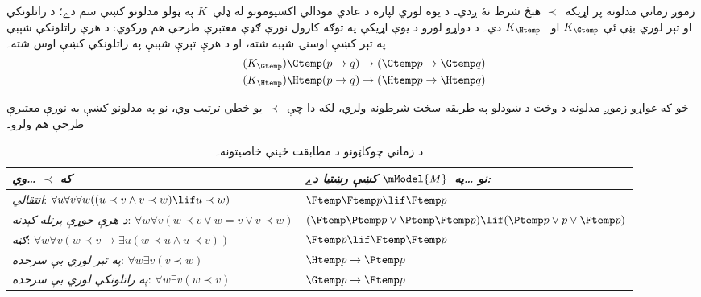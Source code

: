 \documentclass[../../../include/open-logic-section]{subfiles}
\begin{document}


زموږ زماني مدلونه پر اړيکه~$\prec$ هېڅ شرط نۀ ږدي۔ د يوه
لوري لپاره د عادي مودالي اکسيومونو له ډلې~$K$ په ټولو مدلونو
کښې سم دے؛ د راتلونکي او تېر لوري بڼې ئې $K_{\Gtemp}$ او
~$K_{\Htemp}$ دي۔ د دواړو لورو د يوې اړيکې په توګه کارول نورې
ګډې معتبرې طرحې هم ورکوي: د هرې راتلونکې شېبې په تېر کښې
اوسنۍ شېبه شته، او د هرې تېرې شېبې په راتلونکي کښې اوس شته۔
\begin{align*}
\tag{$K_{\Gtemp}$}  \Gtemp (p \to q) & \to (\Gtemp p \to \Gtemp q)\\
\tag{$K_{\Htemp}$}  \Htemp (p \to q) & \to (\Htemp p \to \Htemp q)
\end{align*}

خو که غواړو زموږ مدلونه د وخت د ښودلو په طريقه سخت شرطونه ولري،
لکه دا چې~$\prec$ يو خطي ترتيب وي، نو په مدلونو کښې به نورې
معتبرې طرحې هم ولرو۔

\begin{table}[t]
  \begin{tabular}{| p{} || p{} |}
    \hline
    {\emph{که $\prec$ \dots وي}} & {\emph{نو \dots په~$\mModel{M}$ کښې رښتيا دے:}} \\
    \hline \hline
    \emph{انتقالي}: \newline
    $\forall u \forall v \forall w ((u \prec v \land v \prec w) \lif u \prec w)$ &
    $\Ftemp \Ftemp p \lif \Ftemp p$  \\
    \hline
    \emph{د هرې جوړې پرتله کېدنه}: \newline
    $\forall w \forall v (w \prec v \lor w = v \lor v \prec w)$ &
    $(\Ftemp \Ptemp  p \lor \Ptemp \Ftemp p) \lif (\Ptemp p \lor p \lor \Ftemp p)$\\
    \hline
    \emph{ګڼه}: \newline
    $\forall w \forall v (w \prec v \to \exists u(w \prec u \land u \prec v))$ &
    $\Ftemp p \lif \Ftemp \Ftemp p$ \\
    \hline
    \emph{په تېر لوري بې سرحده}: \newline
    $\forall w \exists v( v \prec w)$ &
    $\Htemp p \to \Ptemp p$ \\
    \hline
    \emph{په راتلونکي لوري بې سرحده}: \newline
    $\forall w \exists v( w \prec v)$ &
    $\Gtemp p \to \Ftemp p$ \\
    \hline
  \end{tabular}
  \caption{د زماني چوکاټونو د مطابقت ځينې خاصيتونه۔}
\end{table}
\end{document}
